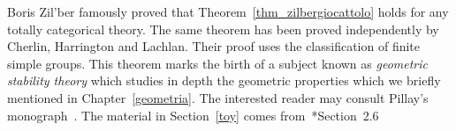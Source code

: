 Boris Zil'ber famously proved that Theorem~\ref{thm_zilbergiocattolo} holds for any totally categorical theory.
The same theorem has been proved independently by Cherlin, Harrington and Lachlan.
Their proof uses the classification of finite simple groups.
This theorem marks the birth of a subject known as \textit{geometric stability theory\/} which studies in depth the geometric properties which we briefly mentioned in Chapter~\ref{geometria}.
The interested reader may consult Pillay's monograph~\cite{Pillay}. 
The material in Section~\ref{toy} comes from~\cite{Pillay}*{Section~2.6} 



\begin{biblist}[]\normalsize
{}\smallskip 
{}\smallskip
\end{biblist}